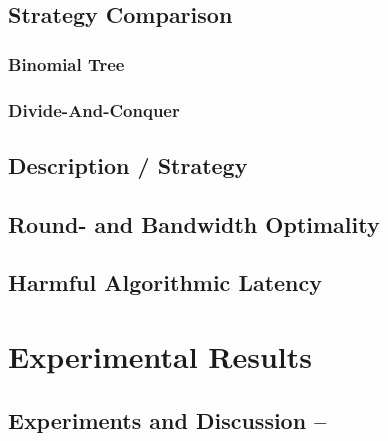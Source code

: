 \subsection{Strategy Comparison}

\subsubsection{Binomial Tree}

\subsubsection{Divide-And-Conquer}

\subsection{Description / Strategy}

\subsection{Round- and Bandwidth Optimality}

\subsection{Harmful Algorithmic Latency}

\section{Experimental Results}

\subsection{Experiments and Discussion -- \mygather}

